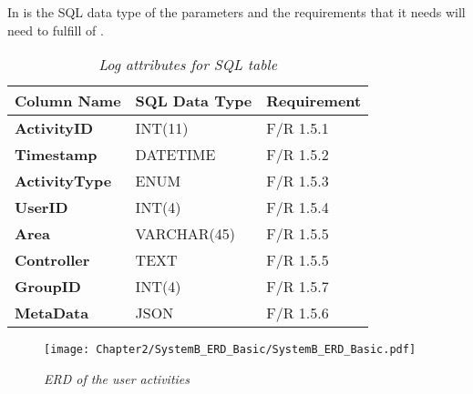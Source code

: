 In  is the SQL data type of the parameters and the requirements that it needs will need to fulfill of . 

\begin{table}[!htb]
	\centering
	\caption[Log attributes for SQL table]
	{\textit{Log attributes for SQL table}}
	\label{tbl:ch2_SQLLoggingTable}
	\begin{tabularx}{\textwidth}{|X|X|X|}
		\hline \textbf{Column Name} & \textbf{SQL Data Type} & \textbf{Requirement} \\
		\hline \textbf{ActivityID} & INT(11) & F/R 1.5.1 \\
		\hline \textbf{Timestamp} & DATETIME & F/R 1.5.2 \\
		\hline \textbf{ActivityType} & ENUM & F/R 1.5.3 \\
		\hline \textbf{UserID} & INT(4) & F/R 1.5.4 \\
		\hline \textbf{Area} & VARCHAR(45) & F/R 1.5.5 \\
		\hline \textbf{Controller} & TEXT & F/R 1.5.5 \\
		\hline \textbf{GroupID} & INT(4) & F/R 1.5.7 \\
		\hline \textbf{MetaData} & JSON & F/R 1.5.6 \\
		\hline
	\end{tabularx}
\end{table}

\begin{figure}[!htb] %
	\centering %
	\texttt{[image: Chapter2/SystemB\_ERD\_Basic/SystemB\_ERD\_Basic.pdf]}
	\caption[ERD of user activities]
	{\textit{ERD of the user activities}}\label{fig:ch2_erdOfEventLogs}
\end{figure}


\clearpage


